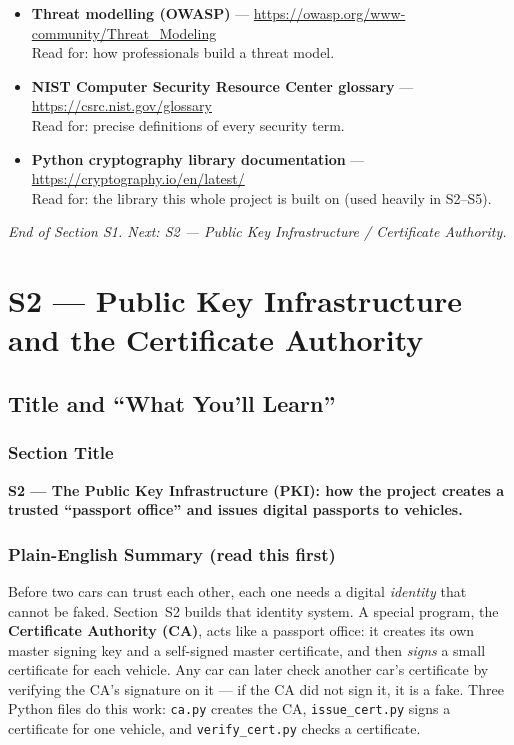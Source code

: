 \documentclass[11pt,a4paper]{report}
\begin{document}
\begin{itemize}
        Read for: why ephemeral keys protect past sessions.
  \item \textbf{Threat modelling (OWASP)} ---
        \url{https://owasp.org/www-community/Threat_Modeling}\\
        Read for: how professionals build a threat model.
  \item \textbf{NIST Computer Security Resource Center glossary} ---
        \url{https://csrc.nist.gov/glossary}\\
        Read for: precise definitions of every security term.
  \item \textbf{Python cryptography library documentation} ---
        \url{https://cryptography.io/en/latest/}\\
        Read for: the library this whole project is built on (used heavily in S2--S5).
\end{itemize}

\vfill
\begin{center}\footnotesize\itshape
End of Section S1. Next: S2 --- Public Key Infrastructure / Certificate Authority.
\end{center}



\chapter{S2 --- Public Key Infrastructure and the Certificate Authority}

\section{Title and ``What You'll Learn''}

\subsection*{Section Title}
\textbf{S2 --- The Public Key Infrastructure (PKI): how the project creates a
trusted ``passport office'' and issues digital passports to vehicles.}

\subsection*{Plain-English Summary (read this first)}
Before two cars can trust each other, each one needs a digital \emph{identity}
that cannot be faked. Section~S2 builds that identity system. A special program,
the \textbf{Certificate Authority (CA)}, acts like a passport office: it creates
its own master signing key and a self-signed master certificate, and then
\emph{signs} a small certificate for each vehicle. Any car can later check
another car's certificate by verifying the CA's signature on it --- if the CA
did not sign it, it is a fake. Three Python files do this work: \texttt{ca.py}
creates the CA, \texttt{issue\_cert.py} signs a certificate for one vehicle, and
\texttt{verify\_cert.py} checks a certificate.
\end{document}
